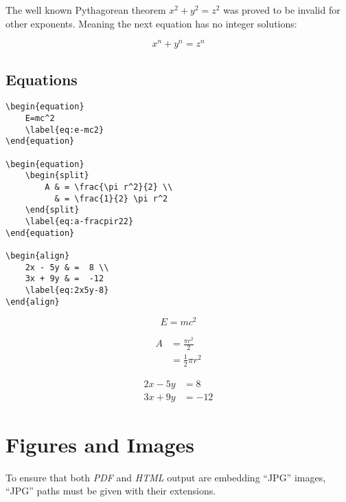 The well known Pythagorean theorem \(x^2 + y^2 = z^2\) was
proved to be invalid for other exponents.
Meaning the next equation has no integer solutions:

\[x^n + y^n = z^n\]

\subsection*{Equations}%
\label{subsec:equations}

\begin{lstlisting}[caption={Equations.}]
\begin{equation}
    E=mc^2
    \label{eq:e-mc2}
\end{equation}

\begin{equation}
    \begin{split}
        A & = \frac{\pi r^2}{2} \\
          & = \frac{1}{2} \pi r^2
    \end{split}
    \label{eq:a-fracpir22}
\end{equation}

\begin{align}
    2x - 5y & =  8 \\
    3x + 9y & =  -12
    \label{eq:2x5y-8}
\end{align}
\end{lstlisting}

\begin{equation}
    E=mc^2
    \label{eq:e-mc2}
\end{equation}

\begin{equation}
    \begin{split}
        A & = \frac{\pi r^2}{2} \\
          & = \frac{1}{2} \pi r^2
    \end{split}
    \label{eq:a-fracpir22}
\end{equation}

\begin{align}
    2x - 5y & =  8 \\
    3x + 9y & =  -12
    \label{eq:2x5y-8}
\end{align}

\section*{Figures and Images}%
\label{sec:figures-and-images}

To ensure that both \textit{PDF} and \textit{HTML} output are embedding
``JPG'' images, ``JPG'' paths must be given with their extensions.


